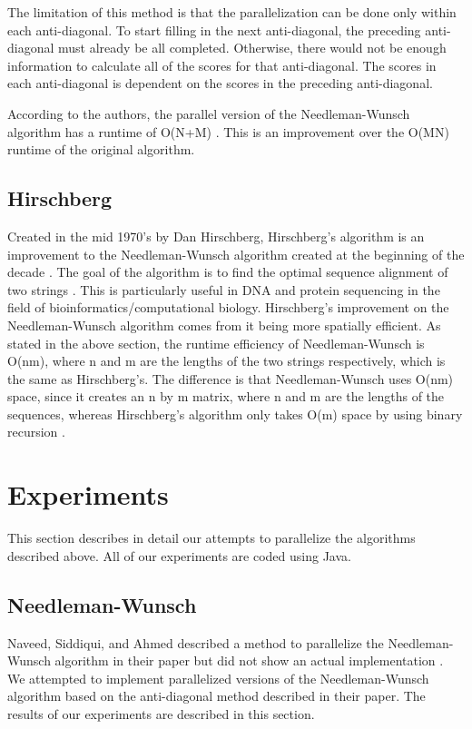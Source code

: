 \documentclass[conference]{IEEEtran}
\begin{document}
The limitation of this method is that the parallelization can be done only within each anti-diagonal. To start filling in the next anti-diagonal, the preceding anti-diagonal must already be all completed. Otherwise, there would not be enough information to calculate all of the scores for that anti-diagonal. The scores in each anti-diagonal is dependent on the scores in the preceding anti-diagonal.

According to the authors, the parallel version of the Needleman-Wunsch algorithm has a runtime of O(N+M) \cite{naveed_siddiqui_ahmed}. This is an improvement over the O(MN) runtime of the original algorithm.

\subsection{Hirschberg}

Created in the mid 1970’s by Dan Hirschberg, Hirschberg’s algorithm is an improvement to the Needleman-Wunsch algorithm created at the beginning of the decade \cite{hirschberg_1975}. The goal of the algorithm is to find the optimal sequence alignment of two strings \cite{hirschberg_1975}. This is particularly useful in DNA and protein sequencing in the field of bioinformatics/computational biology. Hirschberg’s improvement on the Needleman-Wunsch algorithm comes from it being more spatially efficient. As stated in the above section, the runtime efficiency of Needleman-Wunsch is O(nm), where n and m are the lengths of the two strings respectively, which is the same as Hirschberg’s. The difference is that Needleman-Wunsch uses O(nm) space, since it creates an n by m matrix, where n and m are the lengths of the sequences, whereas Hirschberg’s algorithm only takes O(m) space by using binary recursion \cite{edit_distance_revisited}.

\section{Experiments}

This section describes in detail our attempts to parallelize the algorithms described above. All of our experiments are coded using Java.

\setcounter{subsection}{0}

\subsection{Needleman-Wunsch}
Naveed, Siddiqui, and Ahmed described a method to parallelize the Needleman-Wunsch algorithm in their paper but did not show an actual implementation \cite{naveed_siddiqui_ahmed}. We attempted to implement parallelized versions of the Needleman-Wunsch algorithm based on the anti-diagonal method described in their paper. The results of our experiments are described in this section.
\end{document}
